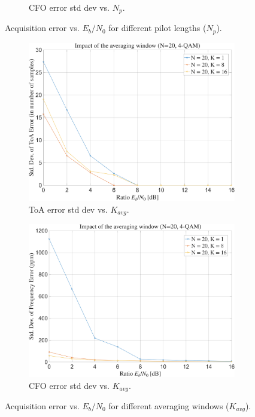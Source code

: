 \documentclass[11pt]{article}
\begin{document}
\begin{figure}[H]
\begin{subfigure}[b]{0.48\textwidth}
					\caption{CFO error std dev vs. $N_p$.}
				\end{subfigure}
				\caption{Acquisition error vs. $E_b/N_0$ for different pilot lengths ($N_p$).}
				\label{fig:acquisition_vs_pilot_len_compact}
			\end{figure}
			
			\begin{figure}[H]
				\centering
				\begin{subfigure}[b]{0.48\textwidth}
					\includegraphics[width=\linewidth]{Images/frame_sync_K_avg.png} 
					\caption{ToA error std dev vs. $K_{avg}$.}
				\end{subfigure}
				\hfill
				\begin{subfigure}[b]{0.48\textwidth}
					\includegraphics[width=\linewidth]{Images/cfo_est_K_avg.png} 
					\caption{CFO error std dev vs. $K_{avg}$.}
				\end{subfigure}
				\caption{Acquisition error vs. $E_b/N_0$ for different averaging windows ($K_{avg}$).}
				\label{fig:acquisition_vs_K_avg_compact}
			\end{figure}
			
\end{document}
